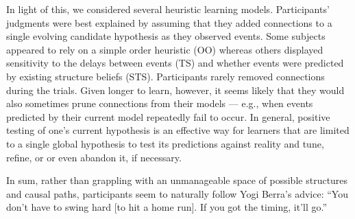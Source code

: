 \documentclass[10pt,letterpaper]{article}
\newcommand{\ttodo}[2][]
{\todo[caption={#2}, size=\small, #1, color = orange, inline]{\renewcommand{\baselinestretch}{1}\selectfont \textbf{TG}: #2}~}
\begin{document}
In light of this, we considered several heuristic learning models. Participants' judgments were best explained by assuming that they added connections to a single evolving candidate hypothesis as they observed events. Some subjects appeared to rely on a simple order heuristic (OO) whereas others displayed sensitivity to the delays between events (TS) and whether events were predicted by existing structure beliefs (STS).  Participants rarely removed connections during the trials. Given longer to learn, however, it seems likely that they would also sometimes prune connections from their models --- e.g., when events predicted by their current model repeatedly fail to occur.  In general, positive testing of one's current hypothesis is an effective way for learners that are limited to a single global hypothesis to test its predictions against reality and tune, refine, or or even abandon it, if necessary. 

In sum, rather than grappling with an unmanageable space of possible structures and causal paths, participants seem to naturally follow Yogi Berra's advice: ``You don't have to swing hard [to hit a home run]. If you got the timing, it'll go.''





\setlength{\bibleftmargin}{.125in}
\setlength{\bibindent}{-\bibleftmargin}

\def\thebibliography#1{\section*{References}
\scriptsize
 \list
 {[\arabic{enumi}]}{\leftmargin \parindent
   \itemindent -\parindent
   \itemsep 0ex plus 1pt
   \parsep 0.1ex plus 1pt minus 1pt
   \usecounter{enumi}}
   \def\newblock{\hskip .11em plus .33em minus .07em}
   \sloppy\clubpenalty4000\widowpenalty4000
   \sfcode`\.=1000\relax}


\end{document}
